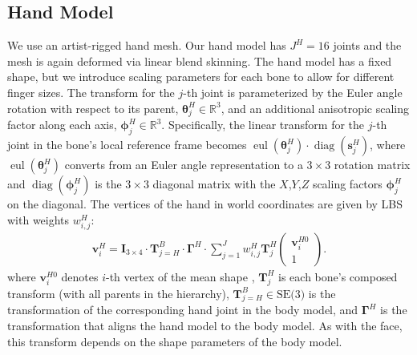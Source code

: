 \subsection{Hand Model}
We use an artist-rigged hand mesh. Our hand model has $J^H{=}16$ joints and the mesh is again deformed via linear blend skinning. The hand model has a fixed shape, but we introduce scaling parameters for each bone to allow for different finger sizes.
The transform for the $j$-th joint is parameterized by the Euler angle rotation
with respect to its parent, $\boldsymbol{\theta}_j^H\in\mathds{R}^3$, and an additional anisotropic scaling factor along each axis, $\boldsymbol{\phi}^H_j\in\mathds{R}^3$. Specifically, the linear transform for the $j$-th joint in the bone's local reference frame becomes $\operatorname{eul}(\boldsymbol{\theta}^H_j)\cdot \operatorname{diag}(\boldsymbol{s}^H_j)$, 
where $\operatorname{eul}(\boldsymbol{\theta}^H_j)$ converts from an Euler angle representation to a $3\times 3$ rotation matrix and $\operatorname{diag}(\boldsymbol{\phi}^H_j)$ is the $3\times 3$ diagonal matrix with the $X$,$Y$,$Z$ scaling factors $\mathbf{\phi}^H_j$ on the diagonal. The vertices of the hand in world coordinates are given by LBS with weights $w^H_{i,j}$: 
\begin{align}
\mathbf{v}^H_i= \mathbf{I}_{3\times 4} \cdot  \mathbf{T}^B_{j=H} \cdot \bm{\Gamma}^H \cdot \sum_{j=1}^J w^H_{i,j}\mathbf{T}^H_j \begin{pmatrix} \mathbf{v}_i^{H0} \\ 1 \end{pmatrix}.
\label{eq:lbs_hand}
\end{align}
where $\mathbf{v}^{H0}_i$ denotes $i$-th vertex of the mean shape , $\mathbf{T}^H_j$ is each bone's composed transform (with all parents in the hierarchy), $\mathbf{T}^B_{j=H}  \in \textrm{SE(3)}$ is the transformation of the corresponding hand joint in the body model, and $\bm{\Gamma}^H$ is the transformation that aligns the hand model to the body model. As with the face, this transform depends on the shape parameters of the body model.



